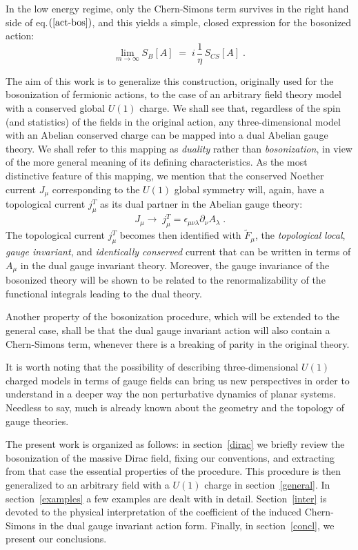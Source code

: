 \documentclass[a4paper,12pt]{article}
\begin{document}
In the low energy regime, only the Chern-Simons term survives in the
right hand side of eq.$\left( {\rm{\ref{act-bos}}}\right) $, and this
yields a simple, closed expression for the bosonized action:
\begin{equation}
 \label{m-inf}
\lim_{m\to \infty }S_B[A]\;=\; i \,\frac{1}{\eta} \,S_{CS}[A]\;.
\end{equation}

The aim of this work is to generalize this construction, originally
used for the bosonization of fermionic actions, to the case of an
arbitrary field theory model with a conserved global $U(1)$ charge. We
shall see that, regardless of the spin (and statistics) of the fields
in the original action, any three-dimensional model with an Abelian
conserved charge can be mapped into a dual Abelian gauge theory.  We
shall refer to this mapping as {\em duality\/} rather than {\em
bosonization}, in view of the more general meaning of its defining
characteristics.  As the most distinctive feature of this mapping, we
mention that the conserved Noether current $J_\mu$ corresponding to the
$U(1)$ global symmetry will, again, have a topological current
$j_\mu^T$ as its dual partner in the Abelian gauge theory:
\begin{equation}
\label{u1-curr}
\,J_\mu \longrightarrow \;j_\mu^T =\epsilon_{\mu \nu \lambda}\partial_\nu A_\lambda \;.
\end{equation}
The topological current $j_\mu^T$ becomes then identified with ${\tilde
  F}_\mu$, the {\em topological} {\em local}, {\em gauge invariant}, and
{\em identically conserved\/} current that can be written in terms of
$A_\mu$ in the dual gauge invariant theory. Moreover, the gauge
invariance of the bosonized theory will be shown to be related to the
renormalizability of the functional integrals leading to the dual
theory.

Another property of the bosonization procedure, which will be extended
to the general case, shall be that the dual gauge invariant action
will also contain a Chern-Simons term, whenever there is a breaking of
parity in the original theory.

\noindent It is worth noting  that the possibility of describing
three-dimensional $U(1)$ charged models in terms of gauge fields can
bring us new perspectives in order to understand in a deeper way the
non perturbative dynamics of planar systems. Needless to say, much is
already known about the geometry and the topology of gauge theories.


The present work is organized as follows: in section~\ref{dirac} we
briefly review the bosonization of the massive Dirac field, fixing our
conventions, and extracting from that case the essential properties of
the procedure.  This procedure is then generalized to an arbitrary
field with a $U(1)$ charge in section~\ref{general}.  In
section~\ref{examples} a few examples are dealt with in detail.
Section~\ref{inter} is devoted to the physical interpretation of the
coefficient of the induced Chern-Simons in the dual gauge invariant
action form. Finally, in section~\ref{concl}, we present our
conclusions.
\end{document}
